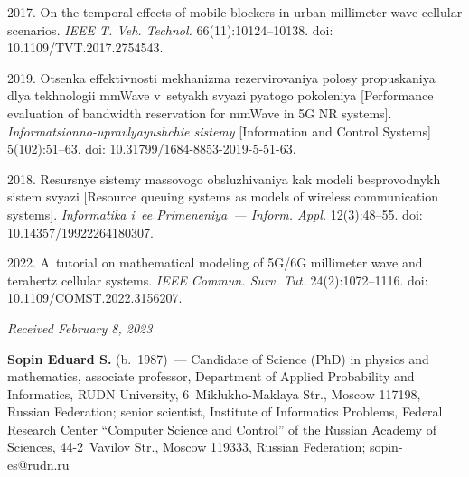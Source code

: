 \begin{multicols}{2}
{{\begin{thebibliography}{9}
 2017. On the temporal effects of mobile blockers in urban millimeter-wave cellular scenarios. \textit{IEEE T. Veh. Technol.} 66(11):10124--10138. 
 doi: 10.1109/TVT.2017.2754543.
 
 2019. Otsen\-ka ef\-fek\-tiv\-nosti me\-kha\-niz\-ma re\-zer\-vi\-ro\-va\-niya po\-lo\-sy 
 pro\-pus\-ka\-niya dlya tekh\-no\-lo\-gii mmWave v~se\-tyakh svya\-zi pya\-to\-go po\-ko\-le\-niya 
 [Performance evaluation of bandwidth reservation for mmWave in 5G NR systems]. \textit{Informatsionno-upravlyayushchie sis\-te\-my} 
 [Information and Control Systems] 5(102):51--63. doi: 10.31799/1684-8853-2019-5-\mbox{51-63}.

 2018. 
Re\-surs\-nye sis\-te\-my mas\-so\-vo\-go ob\-slu\-zhi\-va\-niya kak mo\-de\-li bes\-pro\-vod\-nykh sis\-tem svya\-zi 
[Resource queuing systems as models of wireless communication systems]. 
 \textit{Informatika i~ee Primeneniya~--- Inform. Appl.} 12(3):48--55. doi: 10.14357/19922264180307.

 2022. A~tutorial on mathematical modeling of 5G/6G millimeter wave and terahertz cellular systems. \textit{IEEE Commun. Surv. Tut.} 24(2):1072--1116. 
 doi: 10.1109/COMST.2022.3156207.


\end{thebibliography}

 }
 }

\end{multicols}

\vspace*{-9pt}

\hfill{\small\textit{Received February 8, 2023}} 

\Contr


\noindent
\textbf{Sopin Eduard S.} (b.\ 1987)~--- 
Candidate of Science (PhD) in physics and mathematics, associate professor, Department of Applied Probability and Informatics, 
RUDN University, 6~Miklukho-Maklaya Str., Moscow 117198, Russian Federation; senior scientist, Institute of Informatics Problems, 
Federal Research Center ``Computer Science and Control'' of the Russian Academy of Sciences, 44-2~Vavilov Str., Moscow 119333, Russian Federation; 
\mbox{sopin-es@rudn.ru}

